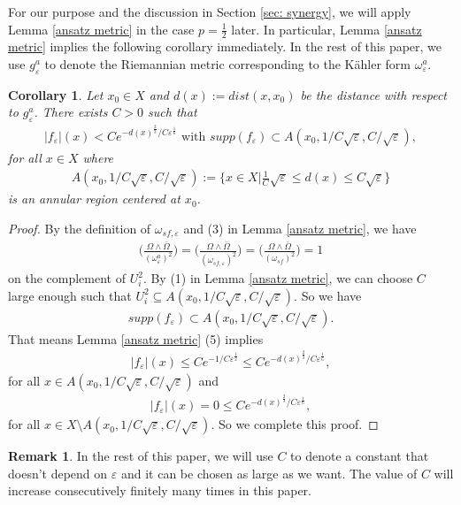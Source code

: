 \documentclass[11pt]{amsart}
\theoremstyle{plain}
\newtheorem{cor}[thm]{Corollary}
\theoremstyle{definition}
\newtheorem{rk}[thm]{Remark}
\numberwithin{equation}{section}
\renewcommand{\leq}{\leqslant}
\renewcommand{\epsilon}{\varepsilon}
\begin{document}
For our purpose and the discussion in Section \ref{sec: synergy}, we will apply Lemma \ref{ansatz metric} in the case $p=\frac{1}{2}$ later. 
In particular, Lemma \ref{ansatz metric} implies the following corollary immediately. In the rest of this paper, we use $g^a_{\varepsilon}$ to denote the Riemannian metric corresponding to the K\"ahler form $\omega^a_{\varepsilon}$.
\begin{cor}\label{est_of_f} Let $x_0\in X$ and $d(x):=dist(x,x_0)$ be the distance with respect to $g^a_{\varepsilon}$. There exists $C>0$ such that
\begin{align}
|f_{\varepsilon}|(x)<Ce^{-d(x)^{\frac{2}{3}}/C\varepsilon^{\frac{1}{6}}}\mbox{ with }supp(f_{\varepsilon})\subset A( x_0,1/C\sqrt{\varepsilon}, C/\sqrt{\varepsilon}),
\end{align}
for all $x\in X$ where
\begin{align*}
A( x_0,1/C\sqrt{\varepsilon}, C/\sqrt{\varepsilon}):=\Big\{x\in X\Big|\frac{1}{C}\sqrt{\varepsilon} \leq d(x)\leq C\sqrt{\varepsilon} \Big\}
\end{align*}
is an annular region centered at $x_0$.
\end{cor}
\begin{proof}
By the definition of $\omega_{sf,\varepsilon}$ and (3) in Lemma \ref{ansatz metric}, we have
\begin{align}
\bigg( \frac{\Omega\wedge \bar{\Omega}}{({\omega}^a_{\epsilon})^2}\bigg)=\bigg( \frac{\Omega\wedge \bar{\Omega}}{({\omega}_{sf,\epsilon})^2}\bigg)=\bigg( \frac{\Omega\wedge \bar{\Omega}}{({\omega}_{sf})^2}\bigg)=1
\end{align}
on the complement of $U^2_i$. By (1) in Lemma \ref{ansatz metric}, we can choose $C$ large enough such that $U^2_i\subseteq A( x_0,1/C\sqrt{\varepsilon}, C/\sqrt{\varepsilon})$. So we have
\begin{align}
supp(f_{\varepsilon})\subset A( x_0,1/C\sqrt{\varepsilon}, C/\sqrt{\varepsilon}).
\end{align}
That means Lemma \ref{ansatz metric} (5) implies
\begin{align}
|f_{\varepsilon}|(x)\leq Ce^{-1/C\epsilon^{\frac{1}{2}}}\leq Ce^{-d(x)^{\frac{2}{3}}/C\epsilon^{\frac{1}{6}}},
\end{align}
for all $x\in A( x_0,1/C\sqrt{\varepsilon}, C/\sqrt{\varepsilon})$ and
\begin{align}
|f_{\varepsilon}|(x)=0\leq Ce^{-d(x)^{\frac{2}{3}}/C\epsilon^{\frac{1}{6}}},
\end{align}
for all $x\in X\setminus A( x_0,1/C\sqrt{\varepsilon}, C/\sqrt{\varepsilon})$. So we complete this proof.
\end{proof}
\begin{rk}
In the rest of this paper, we will use $C$ to denote a constant that doesn't depend on $\varepsilon$ and it can be chosen as large as we want. The value of $C$ will increase consecutively
finitely many times in this paper.
\end{rk}
\end{document}
